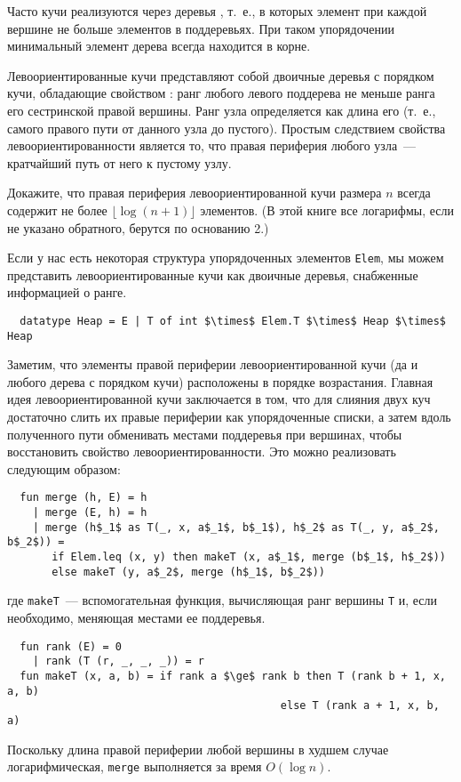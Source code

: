 Часто кучи реализуются через деревья , т.~е., в которых элемент при каждой вершине не
больше элементов в поддеревьях. При таком упорядочении минимальный
элемент дерева всегда находится в корне.

Левоориентированные кучи \cite{Crane1972, Knuth1973a} представляют
собой двоичные деревья с порядком кучи, обладающие свойством
: ранг любого левого поддерева
не меньше ранга его сестринской правой вершины.  Ранг узла
определяется как длина его 
(т.~е., самого правого пути от данного узла до пустого).  Простым
следствием свойства левоориентированности является то, что правая
периферия любого узла~--- кратчайший путь от него к пустому узлу.

\begin{exercise}\label{ex:3.1}
  Докажите, что правая периферия левоориентированной кучи размера $n$
  всегда содержит не более $\lfloor \log(n+1) \rfloor$ элементов. (В
  этой книге все логарифмы, если не указано обратного, берутся по
  основанию 2.)
\end{exercise}

Если у нас есть некоторая структура упорядоченных элементов
\lstinline!Elem!, мы можем представить левоориентированные кучи как
двоичные деревья, снабженные информацией о ранге.
\begin{lstlisting}
  datatype Heap = E | T of int $\times$ Elem.T $\times$ Heap $\times$ Heap
\end{lstlisting}
Заметим, что элементы правой периферии левоориентированной кучи (да и
любого дерева с порядком кучи) расположены в порядке возрастания.
Главная идея левоориентированной кучи заключается в том, что для
слияния двух куч достаточно слить их правые периферии как
упорядоченные списки, а затем вдоль полученного пути обменивать
местами поддеревья при вершинах, чтобы восстановить свойство
левоориентированности.  Это можно реализовать следующим образом:
\begin{lstlisting}
  fun merge (h, E) = h
    | merge (E, h) = h
    | merge (h$_1$ as T(_, x, a$_1$, b$_1$), h$_2$ as T(_, y, a$_2$, b$_2$)) =
       if Elem.leq (x, y) then makeT (x, a$_1$, merge (b$_1$, h$_2$))
       else makeT (y, a$_2$, merge (h$_1$, b$_2$))
\end{lstlisting}
где \lstinline!makeT!~--- вспомогательная функция, вычисляющая ранг
вершины \lstinline!T! и, если необходимо, меняющая местами ее
поддеревья.
\begin{lstlisting}
  fun rank (E) = 0
    | rank (T (r, _, _, _)) = r
  fun makeT (x, a, b) = if rank a $\ge$ rank b then T (rank b + 1, x, a, b)
                                           else T (rank a + 1, x, b, a)
\end{lstlisting}
Поскольку длина правой периферии любой вершины в худшем случае
логарифмическая, \lstinline!merge! выполняется за время $O(\log n)$.

